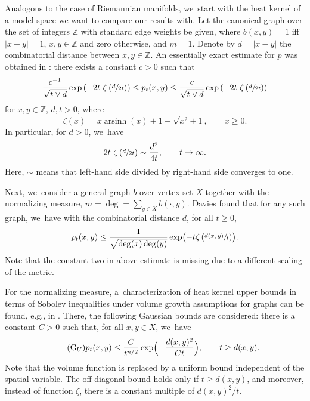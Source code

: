 \documentclass[10pt]{amsart}
\newcommand{\rG}{\mathrm{G}}
\theoremstyle{plain}
\theoremstyle{definition}
\newcommand{\ZZ}{\mathbb{Z}}
\DeclareMathOperator{\arsinh}{arsinh}
\begin{document}
Analogous to the case of Riemannian manifolds, we~start with the heat kernel of a model space we want to compare our results with.
Let the canonical graph over the set of integers $\ZZ$ with standard edge weights be given, where $b(x,y)=1$ iff $|x-y|=1$, $x,y\in\ZZ$ and zero otherwise, and $m=1$. Denote by $d=|x-y|$ the combinatorial distance between $x,y\in\ZZ$.
An essentially exact estimate for $p$ was obtained in \cite[Th.\,3.5]{Pang-93}: there exists a constant $c>0$ such that
\[
\frac{c^{-1}}{\sqrt {t\vee d}}\exp\left(-2t\ \zeta\left(\sfrac{d}{2t}\right)\right)\leq p_t(x,y)\leq \frac{c}{\sqrt {t\vee d}}\exp\left(-2t\ \zeta\left(\sfrac{d}{2t}\right)\right)
\]
for $x,y\in\ZZ$, $d,t>0$,
where
\[
\zeta(x)
=
x\arsinh(x)
+1-\sqrt{x^2+1},\qquad x\geq 0.
\]
In particular, for $d>0$, we~have
\[
2t\ \zeta\left(\sfrac{d}{2t}\right)\sim \frac{d^2}{4t},\qquad t\to \infty.
\]
Here, $\sim$ means that left-hand side divided by right-hand side converges to one.

Next, we~consider a general graph $b$ over vertex set $X$ together with the normalizing measure, \ie $m=\deg=\sum_{y\in X}b(\cdot, y)$. Davies \cite{Davies-93} found that for any such graph, we~have with the combinatorial distance $d$, for all $t\ge 0$,
\[
p_t(x,y)\leq \frac{1}{\sqrt{\deg(x)\deg(y)}}\exp\bigl(-t\zeta\left(\sfrac{d(x,y)}{t}\right)\bigr).
\]
Note that the constant two in above estimate is missing due to a different scaling of the metric.

For the normalizing measure, a~characterization of heat kernel upper bounds in terms of Sobolev inequalities under volume growth assumptions for graphs can be found, e.g., in \cite{Barlow-book}. There, the following Gaussian bounds are considered: there is a constant $C>0$ such that, for all $x,y\in X$, we~have
\begin{equation}\tag{$\rG_U$}\label{eq:GU}
p_t(x,y)\leq \frac{C}{t^{n/2}}\exp\Bigl(-\frac{d(x,y)^2}{Ct}\Bigr),\qquad t\geq d(x,y).
\end{equation}
Note that the volume function is replaced by a uniform bound independent of the spatial variable. The off-diagonal bound holds only if $t\geq d(x,y)$, and moreover, instead of function $\zeta$, there is a constant multiple of $d(x,y)^2/t$.
\end{document}
